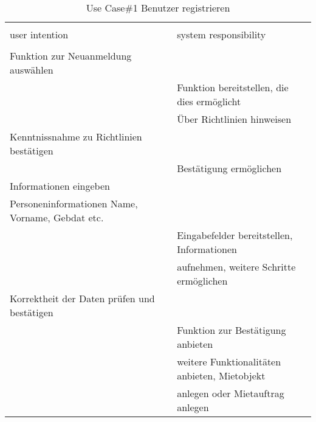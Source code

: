 \begin{table}[H]
\caption{Use Case\#1 Benutzer registrieren }
\centering
\begin{tabular}{l l}
\\ [-0.5ex]

\hline\hline
\\ [-0.5ex]
user intention & system responsibility
\\ [1.5ex]
\hline
\\ [-0.5ex]
Funktion zur Neuanmeldung auswählen 				& 												\\[1ex]
													& Funktion bereitstellen, die dies ermöglicht	\\[1ex]
													& Über Richtlinien hinweisen 					\\[1ex]
Kenntnissnahme zu Richtlinien bestätigen			& 												\\[1ex]
													& Bestätigung ermöglichen						\\[1ex]
Informationen eingeben 								& 												\\[1ex] 
Personeninformationen Name, Vorname, Gebdat etc. 	& 												\\[1ex] 
													& Eingabefelder bereitstellen, Informationen    \\[1ex]
													& aufnehmen, weitere Schritte ermöglichen		\\[1ex]
Korrektheit der Daten prüfen und bestätigen			& 												\\[1ex]
													& Funktion zur Bestätigung anbieten 			\\[1ex]
													& weitere Funktionalitäten anbieten, Mietobjekt \\[1ex]
													& anlegen oder Mietauftrag anlegen				\\[1ex]


\hline
\end{tabular}
\label{tab:anmeldenUC}
\end{table}

